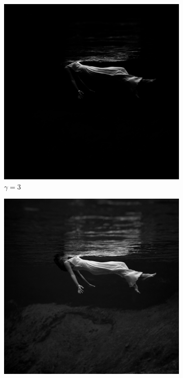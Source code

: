 \begin{figure}
	\centering
	\begin{subfigure}{.32\textwidth}
		\centering
		\includegraphics[width=.99\linewidth]{A1/gamma=3.png}
		\caption{$\gamma=3$}
	\end{subfigure}
	\begin{subfigure}{.32\textwidth}
		\centering
		\includegraphics[width=.99\linewidth]{A1/gamma=1.png}

\end{subfigure}
\end{figure}
